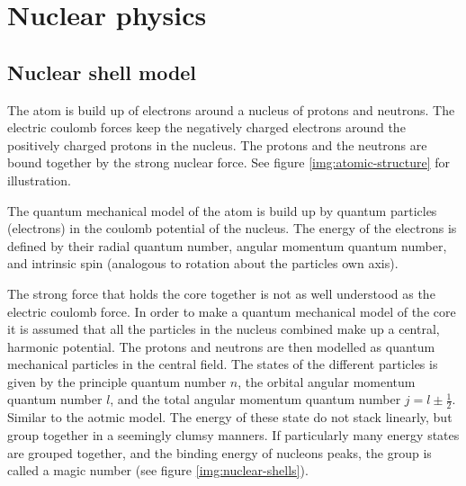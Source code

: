 \section{Nuclear physics}

\subsection{Nuclear shell model} \label{sec:nuclear model}
The atom is build up of electrons around a nucleus of protons and neutrons.
The electric coulomb forces keep the negatively charged electrons around the positively charged
protons in the nucleus. The protons and the neutrons are bound together by the strong nuclear force.
See figure \ref{img:atomic-structure} for illustration.

The quantum mechanical model of the atom is build up by quantum particles (electrons)
in the coulomb potential of the nucleus. The energy of the electrons is defined by their
radial quantum number, angular momentum quantum number, and intrinsic spin (analogous to
rotation about the particles own axis).

The strong force that holds the core together is not as well understood as the electric coulomb
force. In order to make a quantum mechanical model of the core it is assumed that all the
particles in the nucleus combined make up a central, harmonic potential. The protons and neutrons are
then modelled as quantum mechanical particles in the central field.
The states of the different particles is given by the principle quantum number $n$,
the orbital angular momentum quantum number $l$, and the total angular momentum quantum number $j=l\pm\frac{1}{2}$.
Similar to the aotmic model.
The energy of these state do not stack linearly, but group together in a seemingly clumsy manners.
If particularly many energy states are grouped together, and the binding energy of nucleons peaks,
the group is called a magic number (see figure \ref{img:nuclear-shells}).

